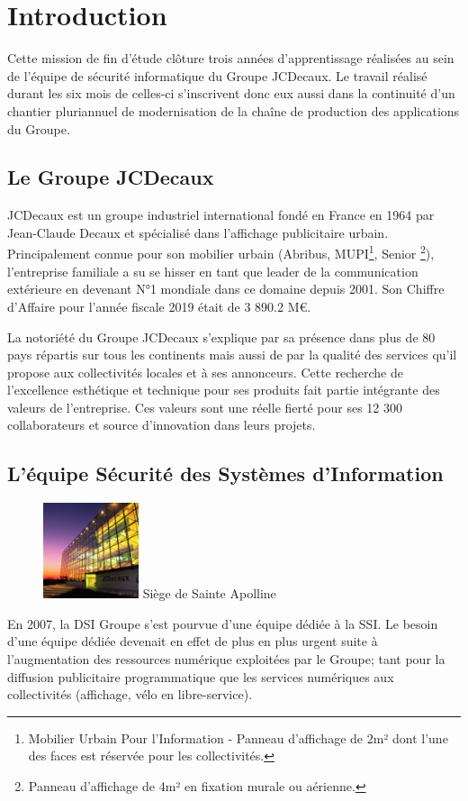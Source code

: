\chapter{Introduction}
Cette mission de fin d'étude clôture trois années d'apprentissage réalisées au sein de l'équipe de sécurité informatique 
du Groupe JCDecaux. Le travail réalisé durant les six mois de celles-ci s'inscrivent donc eux aussi dans la continuité 
d'un chantier pluriannuel de modernisation de la chaîne de production des applications du Groupe.  

\section{Le Groupe JCDecaux}
JCDecaux est un groupe industriel international fondé en France en 1964 par Jean-Claude Decaux et spécialisé dans 
l'affichage publicitaire urbain. Principalement connue pour son mobilier urbain (Abribus, MUPI\footnote{Mobilier Urbain 
Pour l'Information - Panneau d'affichage de 2m² dont l'une des faces est réservée pour les collectivités.}, Senior
\footnote{Panneau d'affichage de 4m² en fixation murale ou aérienne.}), l'entreprise familiale a su se hisser en tant 
que leader de la communication extérieure en devenant N°1 mondiale dans ce domaine depuis 2001. 
\newline Son Chiffre d'Affaire pour l'année fiscale 2019 était de 3 890.2 M€.

La notoriété du Groupe JCDecaux s'explique par sa présence dans plus de 80 pays répartis sur tous les continents mais
aussi de par la qualité des services qu'il propose aux collectivités locales et à ses annonceurs.
\newline Cette recherche de l'excellence esthétique et technique pour ses produits fait partie intégrante des 
valeurs de l'entreprise. Ces valeurs sont une réelle fierté pour ses 12 300 collaborateurs et source d'innovation dans leurs
projets. 

\section{L'équipe Sécurité des Systèmes d'Information}
\begin{figure} 
    \centering \includegraphics[width=0.25\textwidth]{resources/img/jcd_pla_front.jpg}
    \centering Siège de Sainte Apolline
\end{figure}
En 2007, la \ac{DSI} Groupe s'est pourvue d'une équipe dédiée à la \ac{SSI}.
Le besoin d'une équipe dédiée devenait en effet de plus en plus urgent suite à l'augmentation des ressources numérique
exploitées par le Groupe; tant pour la diffusion publicitaire programmatique que les services numériques aux 
collectivités (affichage, vélo en libre-service).

